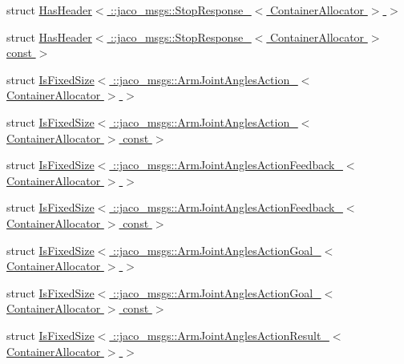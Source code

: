 \begin{DoxyCompactItemize}
\item 
struct \hyperlink{structros_1_1message__traits_1_1HasHeader_3_01_1_1jaco__msgs_1_1StopResponse___3_01ContainerAllocator_01_4_01_4}{Has\+Header$<$ \+::jaco\+\_\+msgs\+::\+Stop\+Response\+\_\+$<$ Container\+Allocator $>$ $>$}
\item 
struct \hyperlink{structros_1_1message__traits_1_1HasHeader_3_01_1_1jaco__msgs_1_1StopResponse___3_01ContainerAllocator_01_4_01const_01_01_4}{Has\+Header$<$ \+::jaco\+\_\+msgs\+::\+Stop\+Response\+\_\+$<$ Container\+Allocator $>$ const  $>$}
\item 
struct \hyperlink{structros_1_1message__traits_1_1IsFixedSize_3_01_1_1jaco__msgs_1_1ArmJointAnglesAction___3_01ContainerAllocator_01_4_01_4}{Is\+Fixed\+Size$<$ \+::jaco\+\_\+msgs\+::\+Arm\+Joint\+Angles\+Action\+\_\+$<$ Container\+Allocator $>$ $>$}
\item 
struct \hyperlink{structros_1_1message__traits_1_1IsFixedSize_3_01_1_1jaco__msgs_1_1ArmJointAnglesAction___3_01Con11bfc126bb9342e0351ed5b857a58c09}{Is\+Fixed\+Size$<$ \+::jaco\+\_\+msgs\+::\+Arm\+Joint\+Angles\+Action\+\_\+$<$ Container\+Allocator $>$ const  $>$}
\item 
struct \hyperlink{structros_1_1message__traits_1_1IsFixedSize_3_01_1_1jaco__msgs_1_1ArmJointAnglesActionFeedback__d2f5b1b90728f232571dc5ca1d44a794}{Is\+Fixed\+Size$<$ \+::jaco\+\_\+msgs\+::\+Arm\+Joint\+Angles\+Action\+Feedback\+\_\+$<$ Container\+Allocator $>$ $>$}
\item 
struct \hyperlink{structros_1_1message__traits_1_1IsFixedSize_3_01_1_1jaco__msgs_1_1ArmJointAnglesActionFeedback__a6106dd883560e6c940667811df6f91d}{Is\+Fixed\+Size$<$ \+::jaco\+\_\+msgs\+::\+Arm\+Joint\+Angles\+Action\+Feedback\+\_\+$<$ Container\+Allocator $>$ const  $>$}
\item 
struct \hyperlink{structros_1_1message__traits_1_1IsFixedSize_3_01_1_1jaco__msgs_1_1ArmJointAnglesActionGoal___3_01ContainerAllocator_01_4_01_4}{Is\+Fixed\+Size$<$ \+::jaco\+\_\+msgs\+::\+Arm\+Joint\+Angles\+Action\+Goal\+\_\+$<$ Container\+Allocator $>$ $>$}
\item 
struct \hyperlink{structros_1_1message__traits_1_1IsFixedSize_3_01_1_1jaco__msgs_1_1ArmJointAnglesActionGoal___3_03024d5d77fc2a9a922e7889fbee57813}{Is\+Fixed\+Size$<$ \+::jaco\+\_\+msgs\+::\+Arm\+Joint\+Angles\+Action\+Goal\+\_\+$<$ Container\+Allocator $>$ const  $>$}
\item 
struct \hyperlink{structros_1_1message__traits_1_1IsFixedSize_3_01_1_1jaco__msgs_1_1ArmJointAnglesActionResult___3_01ContainerAllocator_01_4_01_4}{Is\+Fixed\+Size$<$ \+::jaco\+\_\+msgs\+::\+Arm\+Joint\+Angles\+Action\+Result\+\_\+$<$ Container\+Allocator $>$ $>$}

\end{DoxyCompactItemize}
